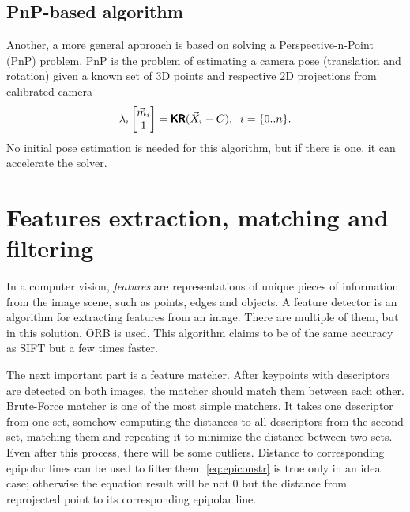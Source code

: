 \subsection{PnP-based algorithm}
\label{sec:pnp}
Another, a more general approach is based on solving a Perspective-n-Point (PnP) problem.
PnP is the problem of estimating a camera pose (translation and rotation) given a known set of 3D points and respective 2D projections from calibrated camera
\begin{equation}
    \lambda_i \begin{bmatrix} \vec{m}_i \\ 1 \end{bmatrix} = \pmb{\mathsf{K}} \pmb{\mathsf{R}} (\vec{X}_i - C), \;\; i = \{0..n\}.
\end{equation}
No initial pose estimation is needed for this algorithm, but if there is one, it can accelerate the solver.



\section{Features extraction, matching and filtering}

In a computer vision, \textit{features} are representations of unique pieces of information from the image scene, such as points, edges and objects.
A feature detector is an algorithm for extracting features from an image.
There are multiple of them, but in this solution, ORB \cite{Rublee2011} is used. 
This algorithm claims to be of the same accuracy as SIFT but a few times faster. 

The next important part is a feature matcher. 
After keypoints with descriptors are detected on both images, the matcher should match them between each other.
Brute-Force matcher is one of the most simple matchers.
It takes one descriptor from one set, somehow computing the distances to all descriptors from the second set, matching them and repeating it to minimize the distance between two sets.
Even after this process, there will be some outliers.
Distance to corresponding epipolar lines can be used to filter them. \autoref{eq:epiconstr} is true only in an ideal case; otherwise the equation result will be not $0$ but the distance from reprojected point to its corresponding epipolar line.

